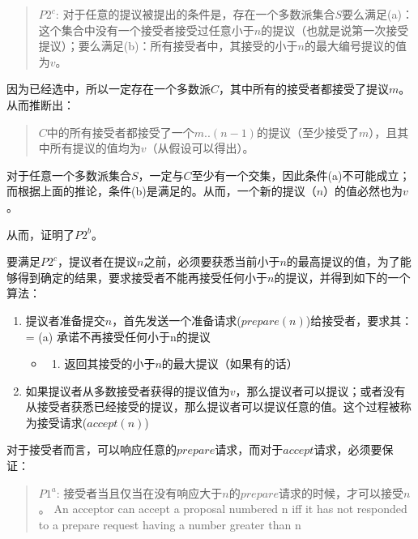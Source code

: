 \documentclass[12pt]{article}
\begin{document}
\begin{quote}
\(P2^{c}\): 对于任意的提议\(<n, v>\)被提出的条件是，存在一个多数派集合\(S\)要么满足(a)：这个集合中没有一个接受者接受过任意小于\(n\)的提议（也就是说第一次接受提议）；要么满足(b)：所有接受者中，其接受的小于\(n\)的最大编号提议的值为\(v\)。
\end{quote}

因为\(<m, v>\)已经选中，所以一定存在一个多数派\(C\)，其中所有的接受者都接受了提议\(m\)。从而推断出：

\begin{quote}
\(C\)中的所有接受者都接受了一个\(m..(n-1)\)的提议（至少接受了\(m\)），且其中所有提议的值均为\(v\)（从假设可以得出）。
\end{quote}

对于任意一个多数派集合\(S\)，一定与\(C\)至少有一个交集，因此条件(a)不可能成立；而根据上面的推论，条件(b)是满足的。从而，一个新的提议（\(n\)）的值必然也为\(v\)。

从而，证明了\(P2^{b}\)。

要满足\(P2^{c}\)，提议者在提议\(n\)之前，必须要获悉当前小于\(n\)的最高提议的值，为了能够得到确定的结果，要求接受者不能再接受任何小于\(n\)的提议，并得到如下的一个算法：

\begin{enumerate}
\def\labelenumi{\arabic{enumi}.}
\tightlist
\item
  提议者准备提交\(n\)，首先发送一个准备请求(\(prepare(n)\))给接受者，要求其： = (a) 承诺不再接受任何小于n的提议

  \begin{itemize}
  \tightlist
  \item
    \begin{enumerate}
    \def\labelenumii{(\alph{enumii})}
    \setcounter{enumii}{1}
    \tightlist
    \item
      返回其接受的小于\(n\)的最大提议（如果有的话）
    \end{enumerate}
  \end{itemize}
\item
  如果提议者从多数接受者获得的提议值为\(v\)，那么提议者可以提议\(<n, v>\)；或者没有从接受者获悉已经接受的提议，那么提议者可以提议任意的值\(<n, Any>\)。这个过程被称为接受请求(\(accept(n)\))
\end{enumerate}

对于接受者而言，可以响应任意的\(prepare\)请求，而对于\(accept\)请求，必须要保证：

\begin{quote}
\(P1^{a}\): 接受者当且仅当在没有响应大于\(n\)的\(prepare\)请求的时候，才可以接受\(n\)。 An acceptor can accept a proposal numbered n iff it has not responded to a prepare request having a number greater than n
\end{quote}
\end{document}
